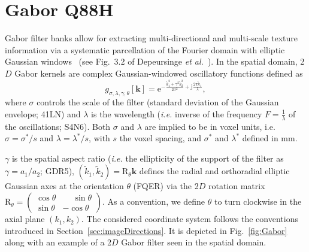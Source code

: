 \documentclass[fleqn,a4paper,oneside,openany]{book}
\newcommand\id[1]{{\hfill\normalsize{\idfont #1}}}
\newcommand\textid[1]{{\normalsize{\idfont #1}}}
\renewcommand{\marginnote}[2][]{}
\begin{document}
\section[Gabor]{Gabor \id{Q88H}}\label{sec:Gabor}
%
Gabor filter banks allow for extracting multi-directional and multi-scale texture information via a systematic parcellation of the Fourier domain with elliptic Gaussian windows~\cite{Bianconi2007} (see Fig.~3.2 of Depeursinge \textit{et al.}~\cite{DeF2017}).
In the spatial domain, 2$D$ Gabor kernels are complex Gaussian-windowed oscillatory functions defined as
%
\begin{equation}\label{eq:Gabor2D}
g_{\sigma,\lambda,\gamma,\theta}[\boldsymbol{k}]=
\mathrm{e}^{
-\frac{
\tilde{k}_1^2 +
\gamma^2\tilde{k}_2^2
}
{2\sigma^2}
+\mathrm{j}\frac{2\pi\tilde{k}_1}{\lambda}}
,
\end{equation}
%
where $\sigma$ controls the scale of the filter (standard deviation of the Gaussian envelope; \textid{41LN}) and $\lambda$ is the wavelength (\textit{i.e.} inverse of the frequency $F=\frac{1}{\lambda}$ of the oscillations; \textid{S4N6}). Both $\sigma$ and $\lambda$ are implied to be in voxel units, i.e. $\sigma = \sigma^* / s$ and $\lambda = \lambda^* / s$, with $s$ the voxel spacing, and $\sigma^*$ and $\lambda^*$ defined in mm.
\marginnote{\footnotesize v4: Clarified units of $\sigma$ and $\lambda$ parameters.}
$\gamma$ is the spatial aspect ratio (\textit{i.e.} the ellipticity of the support of the filter as $\gamma=a_1/a_2$; \textid{GDR5}), \mbox{$(\tilde{k}_1,\tilde{k}_2) =  \mathrm{R}_{\theta} \boldsymbol{k}$} defines the radial and orthoradial elliptic Gaussian axes at the orientation $\theta$ (\textid{FQER}) via the 2$D$ rotation matrix \mbox{$\mathrm{R}_{\theta} = 
\left(\begin{matrix}
\cos\theta &  \phantom{+}\sin\theta \\
\sin\theta & - \cos\theta
\end{matrix}
\right)$}.
As a convention, we define $\theta$ to turn clockwise in the axial plane $(k_1,k_2)$.
The considered coordinate system follows the conventions introduced in Section~\ref{sec:imageDirections}. 
It is depicted in Fig.~\ref{fig:Gabor} along with an example of a 2$D$ Gabor filter seen in the spatial domain.
\end{document}
